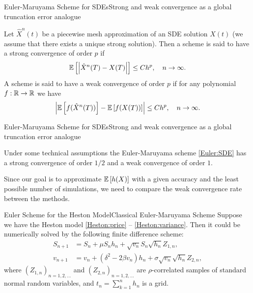 \begin{frame}{Euler-Maruyama Scheme for SDEs}{Strong and weak convergence as a global truncation error analogue}
    \begin{definition}
        Let $\hat X^n(t)$ be a piecewise mesh approximation of an SDE solution $X(t)$ (we assume that there exists a unique strong solution). 
        Then a scheme is said to have a strong convergence of order $p$ if 
        \begin{equation}
            \mathbb{E}\left[\left|\hat X^n(T) - X(T)\right|\right] \leq Ch^p, \quad n \to \infty.
        \end{equation}
        A scheme is said to have a weak convergence of order $p$ if for any polynomial $f: \mathbb{R} \to \mathbb{R}$ we have
        \begin{equation}
            \left|\mathbb{E}\left[f(\hat X^n(T))\right] - \mathbb{E}\left[f(X(T))\right]\right| \leq Ch^p, \quad n \to \infty.
        \end{equation}
    \end{definition}
    
\end{frame}

\begin{frame}{Euler-Maruyama Scheme for SDEs}{Strong and weak convergence as a global truncation error analogue}
    \begin{theorem}
        Under some technical assumptions the Euler-Maruyama scheme \eqref{Euler:SDE} has a strong convergence of order $1/2$ and a weak convergence of order $1$.
    \end{theorem}

    \begin{nb}
        Since our goal is to approximate $\mathbb{E}\left[h(X)\right]$ with a given accuracy and the least possible number of simulations, we need to compare the weak convergence rate between the methods.
    \end{nb}
\end{frame}

\begin{frame}{Euler Scheme for the Heston Model}{Classical Euler-Maruyama Scheme}
    Suppose we have the Heston model \eqref{Heston:price} -- \eqref{Heston:variance}. Then it could be numerically solved by the following finite difference scheme:
    \begin{align}
        S_{n+1} & = S_n + \mu S_n h_n + \sqrt{v_n} S_n \sqrt{h_n} Z_{1,n}, \label{Euler:Heston:price}\\
        v_{n+1} & = v_n + \left(\delta^2 - 2\beta v_n\right) h_n + \sigma \sqrt{v_n} \sqrt{h_n} Z_{2,n}, \label{Euler:Heston:variance}
    \end{align}
    where $(Z_{1,n})_{n=1, 2, \dots}$ and $(Z_{2,n})_{n=1, 2, \dots}$ are $\rho$-correlated samples of standard normal random variables, and $t_n = \sum_{k=1}^n h_n$ is a grid.
\end{frame}

